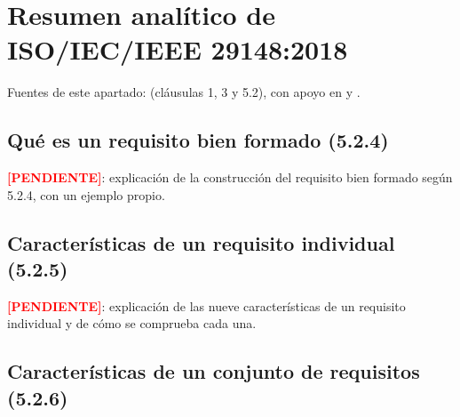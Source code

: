 \documentclass[12pt,a4paper]{article}
\newcommand{\pendiente}[1][]{\textcolor{red}{\textbf{[PENDIENTE#1]}}}
\begin{document}
\section{Resumen analítico de ISO/IEC/IEEE 29148:2018}
\label{sec:resumen}


Fuentes de este apartado: \cite{iso29148} (cláusulas 1, 3 y 5.2), con
apoyo en \cite{pohl2025} y \cite{swebok2024}.

\subsection{Qué es un requisito bien formado (5.2.4)}
\label{sec:bien-formado}


\pendiente{: explicación de la construcción del requisito bien formado
según 5.2.4, con un ejemplo propio.}

\subsection{Características de un requisito individual (5.2.5)}
\label{sec:individual}


\pendiente{: explicación de las nueve características de un requisito
individual y de cómo se comprueba cada una.}

\subsection{Características de un conjunto de requisitos (5.2.6)}
\label{sec:conjunto}
\end{document}
